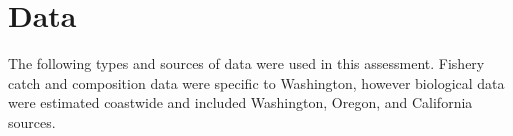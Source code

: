 \documentclass[11pt,
  english,
  letterpaper,
]{article}
\begin{document}
\leavevmode\tagmcend\tagstructend\par


\hypertarget{data}{%
\section{Data}\label{data}}

\leavevmode\tagmcend\tagstructend


The following types and sources of data were used in this assessment. Fishery catch and composition data were specific to Washington, however biological data were estimated coastwide and included Washington, Oregon, and California sources.

\leavevmode\tagmcend\tagstructend\par

\end{document}

